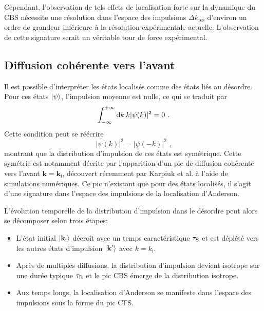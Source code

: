 Cependant, l'observation de tels effets de localisation forte sur la dynamique du CBS nécessite une résolution dans l'espace des impulsions $\Delta k_{\mathrm{res}}$ d'environ un ordre de grandeur inférieure à la résolution expérimentale actuelle. L'observation de cette signature serait un véritable tour de force expérimental.



\subsection{Diffusion cohérente vers l'avant}
Il est possible d'interpréter les états localisés comme des états liés au désordre. Pour ces états $\left| \psi \right\rangle$, l'impulsion moyenne est nulle, ce qui se traduit par
\begin{equation}
\int_{-\infty}^{+\infty}{\mathop{}\mathopen{}\mathrm{d} k \: k |\psi(k)|^2}=0 \text{ .}
\end{equation}
Cette condition peut se réécrire 
\begin{equation}
|\psi(k)|^2=|\psi(-k)|^2 \text{ ,}
\end{equation}
montrant que la distribution d'impulsion de ces états est symétrique. Cette symétrie est notamment décrite par l'apparition d'un pic de diffusion cohérente vers l'avant $\mathbf{k}=\mathbf{k}_{\mathrm{i}}$, découvert récemment par Karpiuk et al. \citep{karpiuk2012coherent} à l'aide de simulations numériques. Ce pic n'existant que pour des états localisés, il s'agit d'une signature dans l'espace des impulsions de la localisation d'Anderson.

L'évolution temporelle de la distribution d'impulsion dans le désordre peut alors se décomposer selon trois étapes:
\begin{itemize}
\item[\textendash] L'état initial $\left| \mathbf{k}_{\mathrm{i}} \right\rangle$ décroît avec un temps caractéristique $\tau_{\mathrm{S}}$ et est déplété vers les autres états d'impulsion $\left| \mathbf{k}' \right\rangle$ avec $k=k_{\mathrm{i}}$. 
\item[\textendash] Après de multiples diffusions, la distribution d'impulsion devient isotrope sur une durée typique $\tau_{\mathrm{B}}$ et le pic CBS émerge de la distribution isotrope. 
\item[\textendash] Aux temps longs, la localisation d'Anderson se manifeste dans l'espace des impulsions sous la forme du pic CFS.
\end{itemize}

